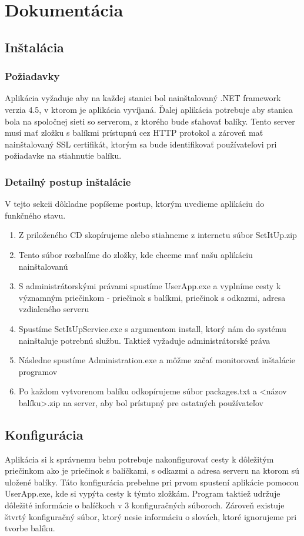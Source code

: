 \chapter{Dokumentácia}

\section{Inštalácia}
\subsection{Požiadavky}
Aplikácia vyžaduje aby na každej stanici bol nainštalovaný .NET framework verzia 4.5, v ktorom je aplikácia vyvíjaná. Ďalej aplikácia potrebuje aby stanica bola na spoločnej sieti so serverom, z ktorého bude sťahovať balíky. Tento server musí mať zložku s balíkmi prístupnú cez HTTP protokol a zároveň mať nainštalovaný SSL certifikát, ktorým sa bude identifikovať používateľovi pri požiadavke na stiahnutie balíku.

\subsection{Detailný postup inštalácie}
V tejto sekcii dôkladne popíšeme postup, ktorým uvedieme aplikáciu do funkčného stavu.
\begin{enumerate}
\item Z priloženého CD skopírujeme alebo stiahneme z internetu súbor SetItUp.zip
\item Tento súbor rozbalíme do zložky, kde chceme mať našu aplikáciu nainštalovanú
\item S administrátorskými právami spustíme UserApp.exe a vyplníme cesty k významným priečinkom - priečinok s balíkmi, priečinok s odkazmi, adresa vzdialeného serveru
\item Spustíme SetItUpService.exe s argumentom install, ktorý nám do systému nainštaluje potrebnú službu. Taktiež vyžaduje administrátorské práva
\item Následne spustíme Administration.exe a môžme začať monitorovať inštalácie programov
\item Po každom vytvorenom balíku odkopírujeme súbor packages.txt a \textless názov balíku\textgreater.zip na server, aby bol prístupný pre ostatných používateľov
\end{enumerate}

\section{Konfigurácia}
Aplikácia si k správnemu behu potrebuje nakonfigurovať cesty k dôležitým priečinkom ako je priečinok s balíčkami, s odkazmi a adresa serveru na ktorom sú uložené balíky. Táto konfigurácia prebehne pri prvom spustení aplikácie pomocou UserApp.exe, kde si vypýta cesty k týmto zložkám. Program taktiež udržuje dôležité informácie o balíčkoch v 3 konfiguračných súboroch. Zároveň existuje štvrtý konfiguračný súbor, ktorý nesie informáciu o slovách, ktoré ignorujeme pri tvorbe balíku.

